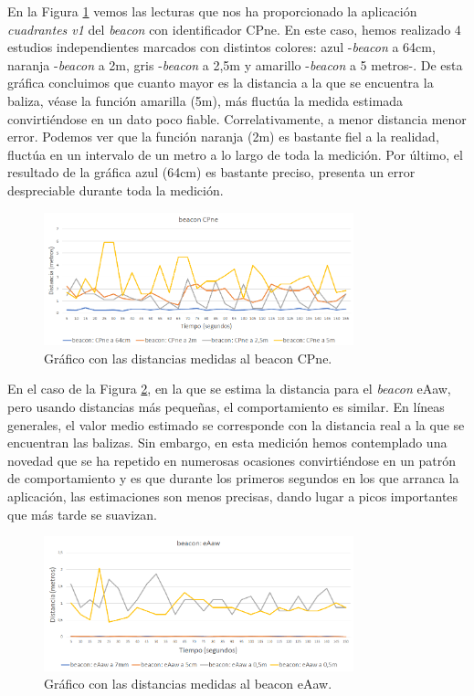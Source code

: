 En la Figura \ref{fig:dist_CPne} vemos las lecturas que nos ha proporcionado la aplicación \textit{cuadrantes v1} del \textit{beacon} con identificador CPne. En este caso, hemos realizado 4 estudios independientes marcados con distintos colores: azul -\textit{beacon} a 64cm, naranja -\textit{beacon} a 2m, gris -\textit{beacon} a 2,5m y amarillo -\textit{beacon} a 5 metros-. De esta gráfica concluimos que cuanto mayor es la distancia a la que se encuentra la baliza, véase la función amarilla (5m), más fluctúa la medida estimada convirtiéndose en un dato poco fiable. Correlativamente, a menor distancia menor error. Podemos ver que la función naranja (2m) es bastante fiel a la realidad, fluctúa en un intervalo de un metro a lo largo de toda la medición. Por último, el resultado de la gráfica azul (64cm) es bastante preciso, presenta un error despreciable durante toda la medición.

\begin{figure}[t]
	\centering
	\includegraphics[width=0.8\textwidth]{Imagenes/Descripciondeltrabajo/dist_CPne}
	\caption{Gráfico con las distancias medidas al beacon CPne. }
	\label{fig:dist_CPne}
\end{figure}

En el caso de la Figura \ref{fig:dist_eAaw}, en la que se estima la distancia para el \textit{beacon} eAaw, pero usando distancias más pequeñas, el comportamiento es similar. En líneas generales, el valor medio estimado se corresponde con la distancia real a la que se encuentran las balizas. Sin embargo, en esta medición hemos contemplado una novedad que se ha repetido en numerosas ocasiones convirtiéndose en un patrón de comportamiento y es que durante los primeros segundos en los que arranca la aplicación, las estimaciones son menos precisas, dando lugar a picos importantes que más tarde se suavizan. 
\begin{figure}[t]
	\centering
	\includegraphics[width=0.8\textwidth]{Imagenes/Descripciondeltrabajo/dist_eAaw}
	\caption{Gráfico con las distancias medidas al beacon eAaw. }
	\label{fig:dist_eAaw}
\end{figure}


